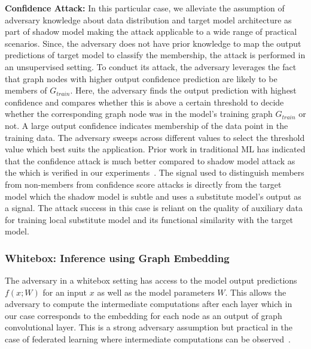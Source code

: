 \noindent\textbf{Confidence Attack:} In this particular case, we alleviate the assumption of adversary knowledge about data distribution and target model architecture as part of shadow model making the attack applicable to a wide range of practical scenarios.
Since, the adversary does not have prior knowledge to map the output predictions of target model to classify the membership, the attack is performed in an unsupervised setting. %
To conduct its attack, the adversary leverages the fact that graph nodes with higher output confidence prediction are likely to be members of $G_{train}$.
Here, the adversary finds the output prediction with highest confidence and compares whether this is above a certain threshold to decide whether the corresponding graph node was in the model's training graph $G_{train}$ or not.
A large output confidence indicates membership of the data point in the training data.
The adversary sweeps across different values to select the threshold value which best suits the application.
Prior work in traditional ML has indicated that the confidence attack is much better compared to shadow model attack as the which is verified in our experiments~\cite{princeton}.
The signal used to distinguish members from non-members from confidence score attacks is directly from the target model which the shadow model is subtle and uses a substitute model's output as a signal.
The attack success in this case is reliant on the quality of auxiliary data for training local substitute model and its functional similarity with the target model.


\subsubsection{Whitebox: Inference using Graph Embedding}

The adversary in a whitebox setting has access to the model output predictions $f(x; W)$ for an input $x$ as well as the model parameters $W$.
This allows the adversary to compute the intermediate computations after each layer which in our case corresponds to the embedding for each node as an output of graph convolutional layer.
This is a strong adversary assumption but practical in the case of federated learning where intermediate computations can be observed~\cite{whitebox,collabinf}.

